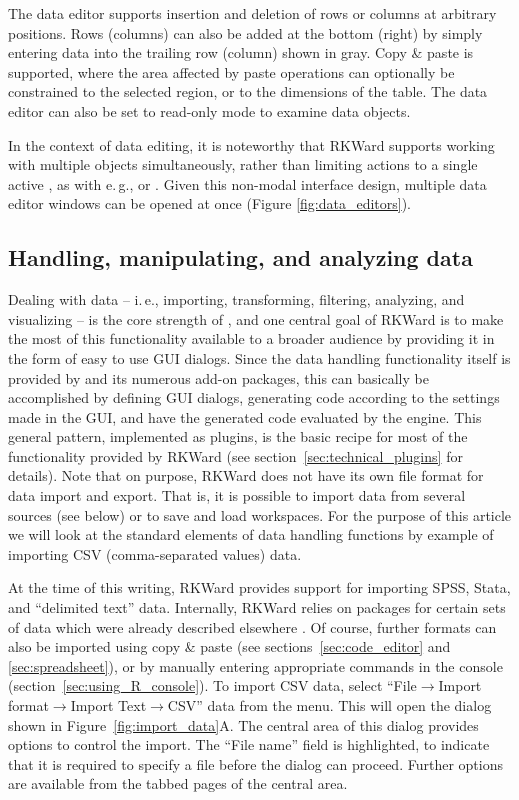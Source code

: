 The data editor supports insertion and deletion of rows or columns at 
arbitrary positions. Rows (columns) can also be added at the bottom 
(right) by simply entering data into the trailing row (column) shown in
gray. Copy \& paste is supported, where the area affected by paste
operations can optionally be constrained to the selected region, or to
the dimensions of the table. The data editor can also be set to read-only
mode to examine data objects.

In the context of data editing, it is noteworthy that
RKWard supports working with multiple objects simultaneously, rather than
limiting actions to a single active , as with e.\,g.,  or
. Given this non-modal interface design, multiple data editor
windows can be opened at once (Figure \ref{fig:data_editors}).

\subsection{Handling, manipulating, and analyzing data}
\label{sec:analyzing_data}

Dealing with data -- i.\,e., importing, transforming, filtering, analyzing, and visualizing  --
is the core strength of , and one central goal of
RKWard is to make the most of this functionality available to a broader
audience by providing it in the form of easy to use GUI dialogs. Since
the data handling functionality itself is provided by
 and its numerous add-on packages, this
can basically be accomplished by defining GUI dialogs, generating
 code according to the settings made in
the GUI, and have the generated code evaluated by the
 engine. 
This general pattern, implemented as plugins, is the
basic recipe for most of the functionality provided by RKWard
(see section~\ref{sec:technical_plugins} for details). 
Note that on purpose, RKWard does not have its
own file format for data import and export. That is, it is possible
to import data from several sources (see below) or to save and load
 workspaces.
For
the purpose of this article we will look at the standard
elements of data handling functions by example of importing CSV
(comma-separated values) data.

At the time of this writing, RKWard provides support for importing SPSS, 
Stata, and ``delimited text'' data. Internally, RKWard
relies on  packages for certain sets of
data which were already described elsewhere
\citep{Murdoch2002}. Of course, further formats can
also be imported using copy \& paste (see sections~\ref{sec:code_editor} and \ref{sec:spreadsheet}), or by
manually entering appropriate  commands in
the  console (section~\ref{sec:using_R_console}). To import CSV
data, select ``File$\rightarrow$Import format$\rightarrow$Import Text$\rightarrow$CSV''
data from the menu. This will open the dialog shown in
Figure~\ref{fig:import_data}A. The central area of this dialog provides 
options to control the import. The 
``File name'' field is highlighted, to indicate that
it is required to specify a file before the dialog can proceed.
Further options are available from the tabbed pages of the central area.

